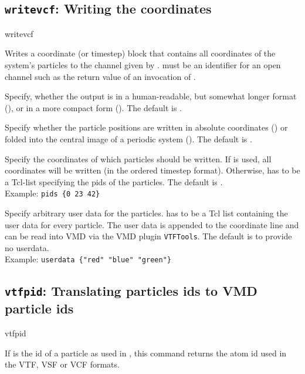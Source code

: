 \subsection{\texttt{writevcf}: Writing  the coordinates}

\begin{essyntax}
  writevcf  
\end{essyntax}
Writes a coordinate (or timestep) block that contains all coordinates
of the system's particles to the channel given by .
 must be an identifier for an open channel such as the
return value of an invocation of .

\begin{arguments}
\item[\opt{\alt{short \asep verbose}}] Specify, whether the output is
  in a human-readable, but somewhat longer format (),
  or in a more compact form (). The default is
  .
  
\item[\opt{\alt{folded \asep absolute}}] Specify whether the particle
  positions are written in absolute coordinates ()
  or folded into the central image of a periodic system
  (). The default is .
  
\item[\opt{pids \alt{\var{pids} \asep all}}] Specify the coordinates
  of which particles should be written. If  is used, all
  coordinates will be written (in the ordered timestep format).
  Otherwise,  has to be a Tcl-list specifying the pids of
  the particles. The default is .\\
  Example: \verb!pids {0 23 42}!

\item[\opt{userdata \var{userdata}}] Specify arbitrary user data for
  the particles.  has to be a Tcl list containing the
  user data for every particle. The user data is appended to the
  coordinate line and can be read into VMD via the VMD plugin
  \texttt{VTFTools}. The default is to provide no userdata.\\
  Example: \verb!userdata {"red" "blue" "green"}!
\end{arguments}

\subsection{\texttt{vtfpid}: Translating \es particles ids to VMD
  particle ids}
\begin{essyntax}
  vtfpid 
\end{essyntax}
If  is the id of a particle as used in \es, this command
returns the atom id used in the VTF, VSF or VCF formats.

